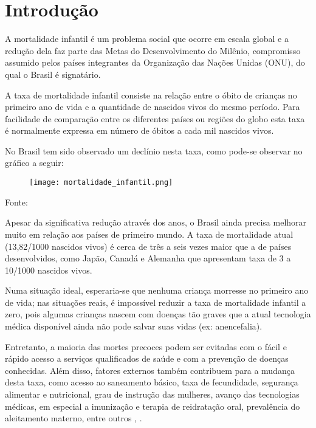 \chapter{Introdução}
A mortalidade infantil é um problema social que ocorre em escala global e a redução
dela faz parte das Metas do Desenvolvimento do Milênio, compromisso assumido pelos países
integrantes da Organização das Nações Unidas (ONU), do qual o Brasil é signatário.

A taxa de mortalidade infantil consiste na relação entre o óbito de crianças no primeiro ano
de vida e a quantidade de nascidos vivos do mesmo período. Para facilidade de comparação entre
os diferentes países ou regiões do globo esta taxa é normalmente expressa em número de óbitos a
cada mil nascidos vivos.

No Brasil tem sido observado um declínio nesta taxa, como pode-se observar no gráfico a seguir:

\begin{center}
\begin{figure}[h]
  \texttt{[image: mortalidade\_infantil.png]}
\end{figure}
Fonte: \cite{ibgeMortalidade}
\end{center}

Apesar da significativa redução através dos anos, o Brasil ainda precisa melhorar
muito em relação aos países de primeiro mundo. A taxa de mortalidade atual (13,82/1000 nascidos vivos)
é cerca de três a seis vezes maior que a de países desenvolvidos, como Japão, Canadá e Alemanha que
apresentam taxa de 3 a 10/1000 nascidos vivos.

Numa situação ideal, esperaria-se que nenhuma criança morresse no primeiro ano de vida; nas situações
reais, é impossível reduzir a taxa de mortalidade infantil a zero, pois algumas crianças nascem com doenças
tão graves que a atual tecnologia médica disponível ainda não pode salvar suas vidas (ex: anencefalia).

Entretanto, a maioria das mortes precoces podem ser evitadas com o fácil e rápido acesso a serviços qualificados de saúde
e com a prevenção de doenças conhecidas. Além disso, fatores externos também
contribuem para a mudança desta taxa, como acesso ao  saneamento básico, taxa de fecundidade,
segurança alimentar e nutricional, grau de instrução das mulheres, avanço das tecnologias médicas,
em especial a imunização e terapia de reidratação oral, prevalência do aleitamento materno,
entre outros \cite{lansky2009mortalidade}, \cite{frias2008politicas}.

